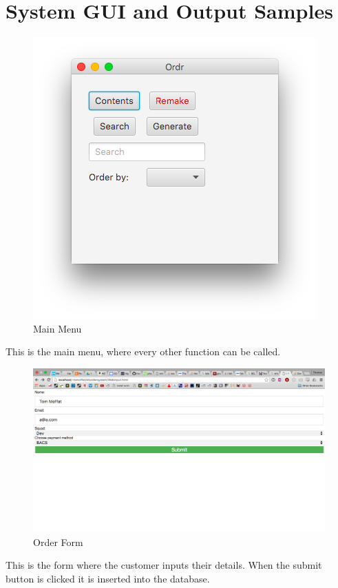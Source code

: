 \documentclass[11pt]{report}
\begin{document}
\section{System GUI and Output Samples}
\begin{figure}[H]
	\centering
	\includegraphics[scale=0.5]{MainMenu}
	\caption{Main Menu}
	\label{mm}
\end{figure}
This is the main menu, where every other function can be called.
\begin{figure}[H]
	\centering
	\includegraphics[width=\linewidth]{CustomerForm}
	\caption{Order Form}
	\label{of}
\end{figure}
This is the form where the customer inputs their details. When the submit button is clicked it is inserted into the database.
\end{document}
